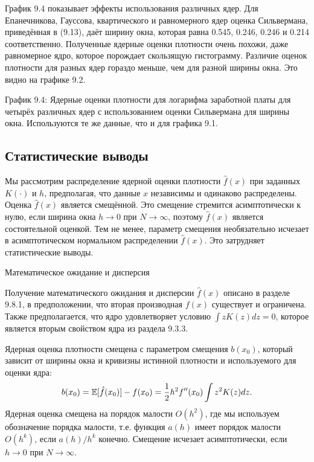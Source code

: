 График 9.4 показывает эффекты  использования различных ядер. Для Епанечникова, Гауссова, квартического и равномерного ядер оценка Сильвермана, приведённая в (9.13), даёт ширину окна, которая равна 0.545, 0.246, 0.246 и 0.214 соответственно. Полученные ядерные оценки плотности очень похожи, даже равномерное ядро, которое порождает скользящую гистограмму. Различие оценок плотности для разных ядер гораздо меньше, чем для разной ширины окна. Это видно на графике 9.2.

\vspace{5cm}

График 9.4: Ядерные оценки плотности для логарифма заработной платы для четырёх различных ядер с использованием оценки Сильвермана для ширины окна. Используются те же данные, что и для графика 9.1.

\subsection{Статистические выводы}

Мы рассмотрим распределение ядерной оценки плотности $\hat{f}(x)$ при заданных $K(\cdot)$ и $h$, предполагая, что данные $x$ независимы и одинаково распределены. Оценка $\hat{f}(x)$ является смещённой. Это смещение стремится асимптотически к нулю, если ширина окна $h \rightarrow 0$ при $N \rightarrow \infty$, поэтому $\hat{f}(x)$ является состоятельной оценкой. Тем не менее, параметр смещения необязательно исчезает в асимптотическом нормальном распределении $\hat{f}(x)$. Это затрудняет статистические выводы.

\begin{center}
Математическое ожидание и дисперсия
\end{center}

Получение математического ожидания и дисперсии $\hat{f}(x)$ описано в разделе 9.8.1, в предположении, что вторая производная $f(x)$ существует и  ограничена. Также предполагается, что ядро удовлетворяет условию $\int zK(z)dz = 0$, которое является вторым свойством ядра из раздела 9.3.3.

Ядерная оценка плотности смещена с параметром смещения $b(x_0)$, который зависит от ширины окна и кривизны истинной плотности и используемого для оценки ядра:
\begin{equation}
b(x_0) = \mathbb{E}[\hat{f}(x_0)] - f(x_0) = \frac{1}{2}h^2 f''(x_0) \int z^2K(z)dz.
\end{equation}
Ядерная оценка смещена на порядок малости $O(h^2)$, где мы используем обозначение порядка малости, т.е. функция $a(h)$ имеет порядок малости $O(h^k)$, если $a(h)/h^k$ конечно. Смещение исчезает асимптотически, если $h \rightarrow 0$ при $N \rightarrow \infty$.

